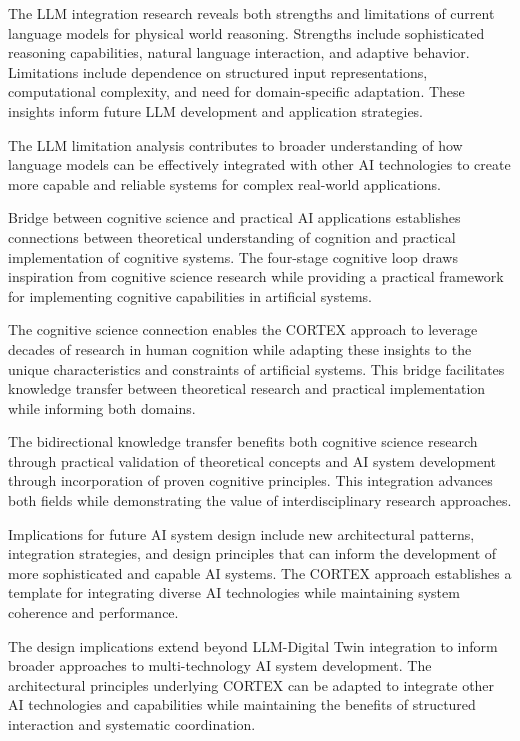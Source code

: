 The LLM integration research reveals both strengths and limitations of current language models for physical world reasoning. Strengths include sophisticated reasoning capabilities, natural language interaction, and adaptive behavior. Limitations include dependence on structured input representations, computational complexity, and need for domain-specific adaptation. These insights inform future LLM development and application strategies.

The LLM limitation analysis contributes to broader understanding of how language models can be effectively integrated with other AI technologies to create more capable and reliable systems for complex real-world applications.

Bridge between cognitive science and practical AI applications establishes connections between theoretical understanding of cognition and practical implementation of cognitive systems. The four-stage cognitive loop draws inspiration from cognitive science research while providing a practical framework for implementing cognitive capabilities in artificial systems.

The cognitive science connection enables the CORTEX approach to leverage decades of research in human cognition while adapting these insights to the unique characteristics and constraints of artificial systems. This bridge facilitates knowledge transfer between theoretical research and practical implementation while informing both domains.

The bidirectional knowledge transfer benefits both cognitive science research through practical validation of theoretical concepts and AI system development through incorporation of proven cognitive principles. This integration advances both fields while demonstrating the value of interdisciplinary research approaches.

Implications for future AI system design include new architectural patterns, integration strategies, and design principles that can inform the development of more sophisticated and capable AI systems. The CORTEX approach establishes a template for integrating diverse AI technologies while maintaining system coherence and performance.

The design implications extend beyond LLM-Digital Twin integration to inform broader approaches to multi-technology AI system development. The architectural principles underlying CORTEX can be adapted to integrate other AI technologies and capabilities while maintaining the benefits of structured interaction and systematic coordination.

